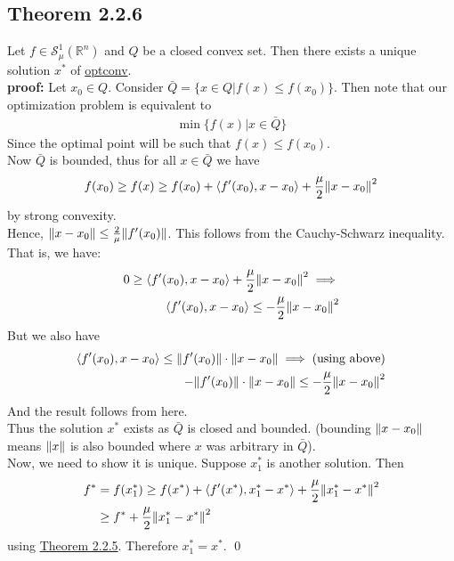 \documentclass[12pt,a4paper]{article}
\begin{document}
	\subsection*{Theorem 2.2.6}\label{thm226}
	Let $f \in \mathcal{S}_\mu^1(\mathbb{R}^n)$ and $Q$ be a closed convex set. Then there exists a unique solution $x^*$ of \hyperref[optconv]{optconv}.\\
	\textbf{proof:} Let $x_0 \in Q$. Consider $\bar{Q} = \{x \in Q | f(x) \leq f(x_0)\}$. Then note that our optimization problem is equivalent to
	\begin{align*}
		\min\{f(x) | x \in \bar{Q}\}
	\end{align*}
	Since the optimal point will be such that $f(x) \leq f(x_0)$. \\
	Now $\bar{Q}$ is bounded, thus for all $x \in \bar{Q}$ we have
	\begin{align*}
		f(x_0) \geq f(x) \geq f(x_0) + \langle f'(x_0), x - x_0 \rangle + \frac{\mu}{2}\norm{x - x_0}^2
	\end{align*}
	by strong convexity. \\
	Hence, $\norm{x - x_0} \leq \frac{2}{\mu}\norm{f'(x_0)}$. This follows from the Cauchy-Schwarz inequality. That is, we have:
	\begin{align*}
		0 \geq \langle f'(x_0), x - x_0 \rangle + \frac{\mu}{2}\norm{x-x_0}^2 \implies \\
		\langle f'(x_0), x - x_0 \rangle \leq -\frac{\mu}{2}\norm{x-x_0}^2
	\end{align*}
	But we also have
	\begin{align*}
		\langle f'(x_0), x - x_0 \rangle \leq \norm{f'(x_0)}\cdot \norm{x - x_0} \implies (\text{using above}) \\
		- \norm{f'(x_0)}\cdot \norm{x - x_0} \leq -\frac{\mu}{2}\norm{x - x_0}^2
	\end{align*}
	And the result follows from here. \\
	Thus the solution $x^*$ exists as $\bar{Q}$ is closed and bounded. (bounding $\norm{x - x_0}$ means $\norm{x}$ is also bounded where $x$ was arbitrary in $\bar{Q}$). \\
	Now, we need to show it is unique. Suppose $x_1^*$ is another solution. Then
	\begin{align*}
		f^* &= f(x_1^*) \geq f(x^*) + \langle f'(x^*), x_1^* - x^* \rangle + \frac{\mu}{2}\norm{x_1^* - x^*}^2 \\
		& \geq f^* + \frac{\mu}{2}\norm{x_1^* - x^*}^2
	\end{align*}
	using \hyperref[thm225]{Theorem 2.2.5}. Therefore $x_1^* = x^*$. \qed
\end{document}
